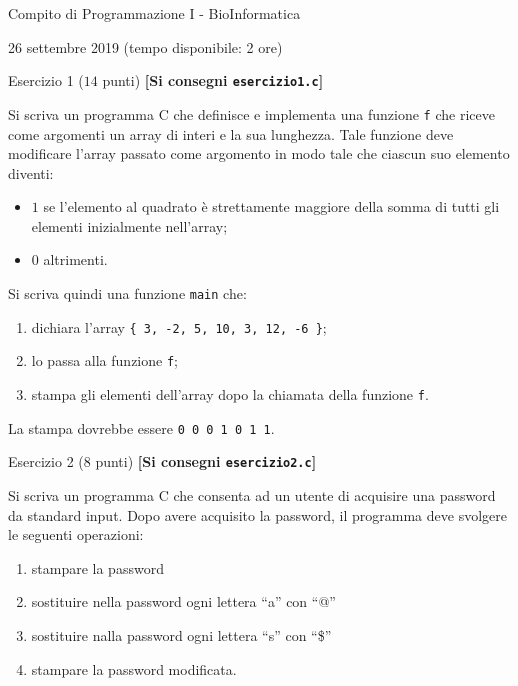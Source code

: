 \documentclass[12pt]{article}
\begin{document}
\begin{center}{\LARGE Compito di Programmazione I - BioInformatica}\\
\vspace*{-2ex}
\begin{center}
  \large 26 settembre 2019 (tempo disponibile: 2 ore)
\end{center}
\end{center}

\vspace*{1ex}
\begin{center}{\Large Esercizio 1} ($14$ punti) \textbf{[Si consegni \texttt{esercizio1.c}]}\end{center}

Si scriva un programma C che definisce e implementa una funzione \texttt{f} che riceve come
argomenti un array di interi e la sua lunghezza. Tale funzione deve modificare l'array passato
come argomento in modo tale che ciascun suo elemento diventi:

\begin{itemize}
\item $1$ se l'elemento al quadrato \`e strettamente maggiore della somma di tutti gli elementi
  inizialmente nell'array;
\item $0$ altrimenti.
\end{itemize}

Si scriva quindi una funzione \texttt{main} che:

\begin{enumerate}
\item dichiara l'array \texttt{\{ 3, -2, 5, 10, 3, 12, -6 \}};
\item lo passa alla funzione \texttt{f};
\item stampa gli elementi dell'array dopo la chiamata della funzione \texttt{f}.
\end{enumerate}

La stampa dovrebbe essere \texttt{0 0 0 1 0 1 1}.

\vspace*{2ex}
\begin{center}{\Large Esercizio 2} ($8$ punti) \textbf{[Si consegni \texttt{esercizio2.c}]}\end{center}
Si scriva un programma C che consenta ad un utente di acquisire una password da standard input.
Dopo avere acquisito la password, il programma deve svolgere le seguenti operazioni:
\begin{enumerate}
	\item stampare la password
	\item sostituire nella password ogni lettera ``a'' con ``@''
	\item sostituire nalla password ogni lettera ``s'' con ``\$''
	\item stampare la password modificata.
\end{enumerate} 
\end{document}
